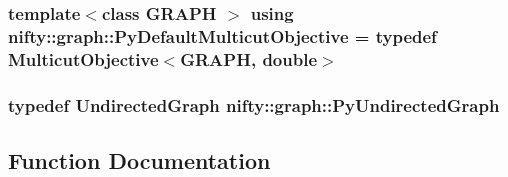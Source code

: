 \subsubsection[{Py\+Default\+Multicut\+Objective}]{\setlength{\rightskip}{0pt plus 5cm}template$<$class G\+R\+A\+P\+H $>$ using {\bf nifty\+::graph\+::\+Py\+Default\+Multicut\+Objective} = typedef {\bf Multicut\+Objective}$<$G\+R\+A\+P\+H, double$>$}\label{namespacenifty_1_1graph_af3761eb48c25055911bbb9d073dccbf4}
\hypertarget{namespacenifty_1_1graph_a62ff5304d118f627910196adc6ab7aab}{}
\subsubsection[{Py\+Undirected\+Graph}]{\setlength{\rightskip}{0pt plus 5cm}typedef {\bf Undirected\+Graph} {\bf nifty\+::graph\+::\+Py\+Undirected\+Graph}}\label{namespacenifty_1_1graph_a62ff5304d118f627910196adc6ab7aab}


\subsection{Function Documentation}
\hypertarget{namespacenifty_1_1graph_a8f3282d2d63b3f644bf2176ed21d3082}{}
